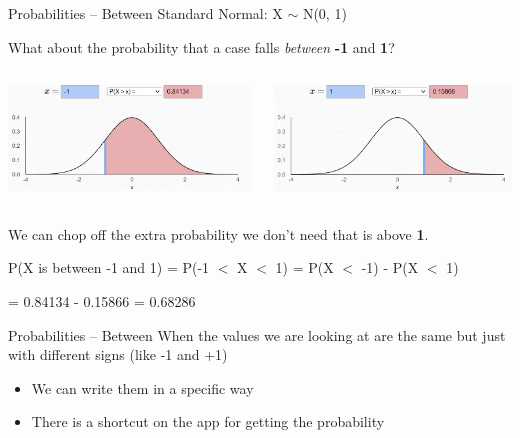 \documentclass{beamer}
\begin{document}
\begin{frame}{Probabilities -- Between}
Standard Normal: X $\sim$ N(0, 1)

What about the probability that a case falls \textit{between} \textbf{-1} and \textbf{1}? \vspace{8mm}

\begin{columns}
 \begin{column}{0.37\textwidth}
\includegraphics[scale=.38]{img/norm_prob4.jpg}
 \end{column}
 \begin{column}{0.37\textwidth}
\includegraphics[scale=.38]{img/norm_prob5.jpg}
 \end{column}
\end{columns}

We can chop off the extra probability we don't need that is above \textbf{1}. \vspace{8mm}

P(X is between -1 and 1) = P(-1 $<$ X $<$ 1) = P(X $<$ -1) - P(X $<$ 1)

\hspace{41mm} = 0.84134 - 0.15866 = 0.68286
\end{frame}


\begin{frame}{Probabilities -- Between}
When the values we are looking at are the same but just with different signs (like -1 and +1)
\begin{itemize}
    \item We can write them in a specific way
    \item There is a shortcut on the app for getting the probability
\end{itemize}
\end{frame}
\end{document}
